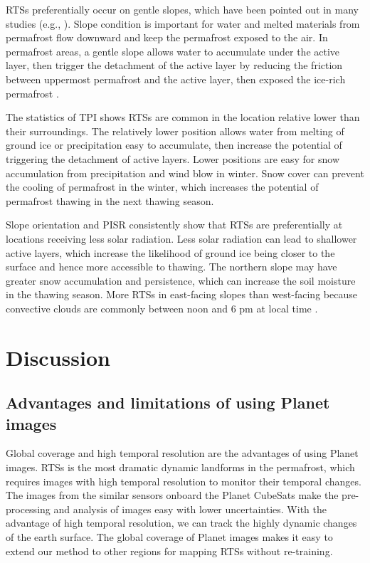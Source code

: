 \documentclass[preprint,12pt,authoryear]{elsarticle}
\begin{document}
RTSs preferentially occur on gentle slopes, which have been pointed out in many studies (e.g., \citealp{leibman1995cryogenic, niu2014thaw, lacelle_distribution_2015}). Slope condition is important for water and melted materials from permafrost flow downward and keep the permafrost exposed to the air. In permafrost areas, a gentle slope allows water to accumulate under the active layer, then trigger the detachment of the active layer by reducing the friction between uppermost permafrost and the active layer, then exposed the ice-rich permafrost \citep{mcroberts1974stability, mcroberts1974the}. 

The statistics of TPI shows RTSs are common in the location relative lower than their surroundings. The relatively lower position allows water from melting of ground ice or precipitation easy to accumulate, then increase the potential of triggering the detachment of active layers. Lower positions are easy for snow accumulation from precipitation and wind blow in winter. Snow cover can prevent the cooling of permafrost in the winter, which increases the potential of permafrost thawing in the next thawing season. 

Slope orientation and PISR consistently show that RTSs are preferentially at locations receiving less solar radiation. Less solar radiation can lead to shallower active layers, which increase the likelihood of ground ice being closer to the surface and hence more accessible to thawing. The northern slope may have greater snow accumulation and persistence, which can increase the soil moisture in the thawing season. More RTSs in east-facing slopes than west-facing because convective clouds are commonly between noon and 6 pm at local time
\citep{niu2014thaw}.


\section{Discussion}
\label{sec_discussion}

\subsection{Advantages and limitations of using Planet images}
\label{subsec_advantage_limitation_planet}

Global coverage and high temporal resolution are the advantages of using Planet images. RTSs is the most dramatic dynamic landforms in the permafrost, which requires images with high temporal resolution to monitor their temporal changes. The images from the similar sensors onboard the Planet CubeSats make the pre-processing and analysis of images easy with lower uncertainties. With the advantage of high temporal resolution, we can track the highly dynamic changes of the earth surface. 
The global coverage of Planet images makes it easy to extend our method to other regions for mapping RTSs without re-training. 
\end{document}
